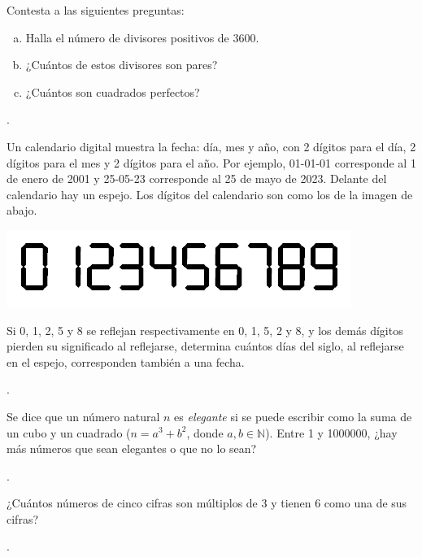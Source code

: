 \documentclass[11pt]{scrartcl}
\begin{document}
\begin{problem}
Contesta a las siguientes preguntas:
\begin{enumerate}[a)]
    \item Halla el número de divisores positivos de 3600.
    \item ¿Cuántos de estos divisores son pares?
    \item ¿Cuántos son cuadrados perfectos?
\end{enumerate}
\begin{hint}
    .
\end{hint}
\end{problem}
\begin{problem}
Un calendario digital muestra la fecha: día, mes y año, con 2 dígitos para el día, 2 dígitos para el mes y 2 dígitos para el año. Por ejemplo, 01-01-01 corresponde al 1 de enero de 2001 y 25-05-23 corresponde al 25 de mayo de 2023. Delante del calendario hay un espejo. Los dígitos del calendario son como los de la imagen de abajo.
\begin{center}
    \includegraphics[scale=0.5]{clase_04_mayo.png}
\end{center}
Si 0, 1, 2, 5 y 8 se reflejan respectivamente en 0, 1, 5, 2 y 8, y los demás dígitos pierden su significado al reflejarse, determina cuántos días del siglo, al reflejarse en el espejo, corresponden también a una fecha.
\begin{hint}
    .
\end{hint}
\end{problem}

\begin{problem}[Rusia]
    Se dice que un número natural \(n\) es \textit{elegante} si se puede escribir como la suma de un cubo y un cuadrado (\( n = a^3 + b^2 \), donde \( a, b \in \mathbb{N} \)). Entre 1 y 1000000, ¿hay más números que sean elegantes o que no lo sean?
\begin{hint}
    .
\end{hint}
\end{problem}

\begin{problem}
¿Cuántos números de cinco cifras son múltiplos de 3 y tienen 6 como una de sus cifras?
\begin{hint}
    .
\end{hint}    
\end{problem}

\end{document}
